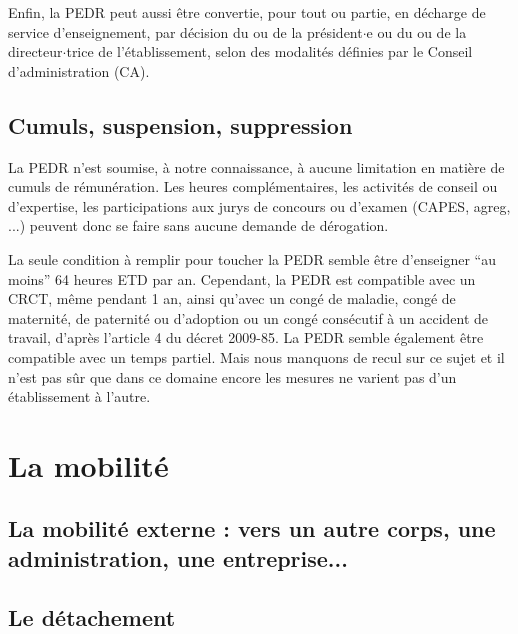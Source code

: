 Enfin, la PEDR peut aussi \^etre convertie, pour tout ou partie, en d\'echarge de service d'enseignement, par d\'ecision du ou de la pr\'esident$\cdot$e ou du ou de la directeur$\cdot$trice de l'\'etablissement, selon des modalit\'es d\'efinies par le Conseil d'administration (CA).



\subsection{Cumuls, suspension, suppression}

La PEDR n'est soumise, \`a notre connaissance, \`a aucune limitation
en mati\`ere de cumuls de r\'emun\'eration. Les heures compl\'ementaires, les
activit\'es de conseil ou d'expertise, les participations aux jurys de concours
ou d'examen (CAPES, agreg, ...) peuvent donc se faire sans aucune demande
de d\'erogation.

La seule condition \`a remplir pour toucher la PEDR semble \^etre d'enseigner ``au moins''
64 heures ETD par an. Cependant, la PEDR est compatible avec un CRCT, m\^eme pendant 1 an, ainsi qu'avec un cong\'e de maladie, cong\'e de maternit\'e, de paternit\'e ou d'adoption ou un cong\'e cons\'ecutif \`a un accident de travail, d'apr\`es l'article 4 du d\'ecret 2009-85. La PEDR
semble \'egalement \^etre compatible avec un temps partiel. Mais nous manquons de recul sur ce sujet
et il n'est pas s\^ur que dans ce domaine encore les mesures ne  varient pas  d'un \'etablissement \`a
l'autre.





\section{La mobilit\'e}

\subsection{La mobilit\'e externe : vers un autre corps, une administration, une entreprise...}

\subsection*{Le d\'etachement}

